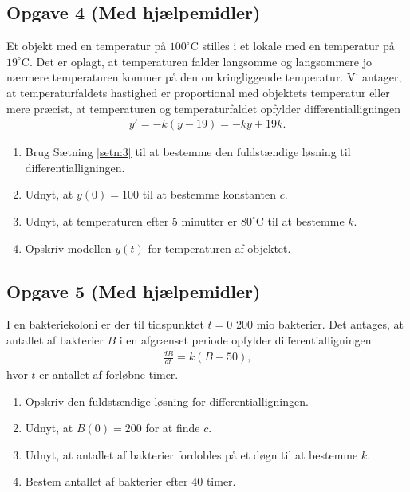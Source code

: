 \subsection*{Opgave 4 (Med hjælpemidler)}
	Et objekt med en temperatur på $100^\circ$C stilles i et lokale med en temperatur på $19^\circ$C. Det er oplagt, at temperaturen falder langsomme og langsommere jo nærmere
	temperaturen kommer på den omkringliggende temperatur. Vi antager, at temperaturfaldets hastighed er proportional med objektets temperatur eller mere præcist, at 
	temperaturen og temperaturfaldet opfylder differentialligningen
	\begin{align*}
		y' = -k(y-19) = -ky+19k.
	\end{align*}
	\begin{enumerate}[label=\roman*)]
		\item Brug Sætning \ref{setn:3} til at bestemme den fuldstændige løsning til differentialligningen. 
		\item Udnyt, at $y(0) = 100$ til at bestemme konstanten $c$. 
		\item Udnyt, at temperaturen efter 5 minutter er $80^\circ$C til at bestemme $k$. 
		\item Opskriv modellen $y(t)$ for temperaturen af objektet. 
	\end{enumerate}

\subsection*{Opgave 5 (Med hjælpemidler)}
I en bakteriekoloni er der til tidspunktet $t = 0$ 200 mio bakterier. Det antages, at antallet af bakterier $B$ i en afgrænset periode opfylder differentialligningen
\begin{align*}
	\frac{dB}{dt} = k(B - 50),
\end{align*}
hvor $t$ er antallet af forløbne timer.
\begin{enumerate}[label = \roman*)]
	\item Opskriv den fuldstændige løsning for differentialligningen.
	\item Udnyt, at $B(0) = 200$ for at finde $c$.
	\item Udnyt, at antallet af bakterier fordobles på et døgn til at bestemme $k$.
	\item Bestem antallet af bakterier efter 40 timer. 
\end{enumerate}
